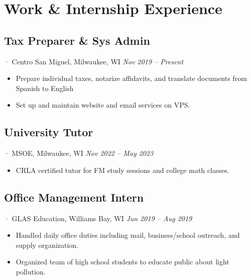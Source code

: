 \documentclass[12pt]{article}
\newcommand{\itemspace}{\vspace{0.1870em}}
\begin{document}
\section{Work \& Internship Experience}

\subsection{Tax Preparer \& Sys Admin}
· Centro San Miguel, Milwaukee, WI \hfill \textit{Nov 2019 -- Present}

\begin{itemize}[noitemsep,nolistsep]
  \item Prepare individual taxes, notarize affidavits, and translate documents
    from Spanish to English

  \item Set up and maintain website and email services on VPS.
\end{itemize}

\itemspace

\subsection{University Tutor}
· MSOE, Milwaukee, WI \hfill \textit{Nov 2022 -- May 2023}

\begin{itemize}[noitemsep,nolistsep]
  \item CRLA certified tutor for FM study sessions and college math classes.
\end{itemize}

\itemspace

\subsection{Office Management Intern}
· GLAS Education, Williams Bay, WI  \hfill \textit{Jun 2019 -- Aug 2019}

\begin{itemize}[noitemsep,nolistsep]
  \item Handled daily office duties including mail, business/school outreach,
    and supply organization.

  \item Organized team of high school students to educate public about light
    pollution.
\end{itemize}
\end{document}
